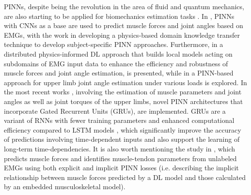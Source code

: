 PINNs, despite being the revolution in the area of fluid and quantum mechanics, are also starting to be applied for biomechanics estimation tasks \cite{Zhang2023, Ma2024, ZhiboZhang2022, Taneja2024, Kumar2023, Zhang2022_2, Kumar2024, Zhang2023_2}. In \cite{Zhang2022_2, Zhang2023}, PINNs with CNNs as a base are used to predict muscle forces and joint angles based on EMGs, with the work in \cite{Zhang2022_2} developing a physics-based domain knowledge transfer technique to develop subject-specific PINN approaches. Furthermore, in \cite{Zhang2023_2} a distributed physics-informed DL approach that builds local models acting on subdomains of EMG input data to enhance the efficiency and robustness of muscle forces and joint angle estimation, is presented, while in \cite{Kumar2023} a PINN-based approach for upper limb joint angle estimation under various loads is explored.
In the most recent works \cite{Taneja2024, Kumar2024}, involving the estimation of muscle parameters and joint angles \cite{Taneja2024} as well as joint torques \cite{Kumar2024} of the upper limbs, novel PINN architectures that incorporate Gated Recurrent Units (GRUs), are implemented. GRUs are a variant of RNNs with fewer training parameters and enhanced computational efficiency compared to LSTM models \cite{Cho2014, Chollet2017}, which significantly improve the accuracy of predictions involving time-dependent inputs and also support the learning of long-term time-dependencies. It is also worth mentioning the study in \cite{Ma2024}, which predicts muscle forces and identifies muscle-tendon parameters from unlabeled EMGs using both explicit and implicit PINN losses (i.e. describing the implicit relationship between muscle forces predicted by a DL model and those calculated by an embedded musculoskeletal model). 

